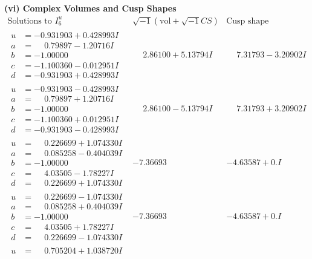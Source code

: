 \documentclass[1p]{elsarticle_modified}
\theoremstyle{definition}
\newcommand{\I}{\sqrt{-1}}
\begin{document}
\newpage\flushleft \textbf{(vi) Complex Volumes and Cusp Shapes}
$$\begin{array}{c|c|c}  
\text{Solutions to }I^u_{6}& \I (\text{vol} + \sqrt{-1}CS) & \text{Cusp shape}\\
 \hline 
\begin{aligned}
u &= -0.931903 + 0.428993 I \\
a &= \phantom{-}0.79897 - 1.20716 I \\
b &= -1.00000\phantom{ +0.000000I} \\
c &= -1.100360 - 0.012951 I \\
d &= -0.931903 + 0.428993 I\end{aligned}
 & \phantom{-}2.86100 + 5.13794 I & \phantom{-}7.31793 - 3.20902 I \\ \hline\begin{aligned}
u &= -0.931903 - 0.428993 I \\
a &= \phantom{-}0.79897 + 1.20716 I \\
b &= -1.00000\phantom{ +0.000000I} \\
c &= -1.100360 + 0.012951 I \\
d &= -0.931903 - 0.428993 I\end{aligned}
 & \phantom{-}2.86100 - 5.13794 I & \phantom{-}7.31793 + 3.20902 I \\ \hline\begin{aligned}
u &= \phantom{-}0.226699 + 1.074330 I \\
a &= \phantom{-}0.085258 - 0.404039 I \\
b &= -1.00000\phantom{ +0.000000I} \\
c &= \phantom{-}4.03505 - 1.78227 I \\
d &= \phantom{-}0.226699 + 1.074330 I\end{aligned}
 & -7.36693\phantom{ +0.000000I} & -4.63587 + 0. I\phantom{ +0.000000I} \\ \hline\begin{aligned}
u &= \phantom{-}0.226699 - 1.074330 I \\
a &= \phantom{-}0.085258 + 0.404039 I \\
b &= -1.00000\phantom{ +0.000000I} \\
c &= \phantom{-}4.03505 + 1.78227 I \\
d &= \phantom{-}0.226699 - 1.074330 I\end{aligned}
 & -7.36693\phantom{ +0.000000I} & -4.63587 + 0. I\phantom{ +0.000000I} \\ \hline\begin{aligned}
u &= \phantom{-}0.705204 + 1.038720 I \\

\end{aligned}
\end{array}$$
\end{document}
